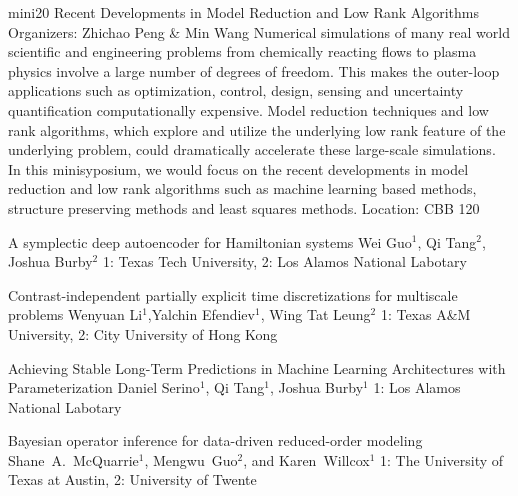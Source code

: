 \mini
{mini20}
{Recent Developments in Model Reduction and Low Rank Algorithms}
{Organizers: Zhichao Peng \& Min Wang}
{Numerical simulations of many real world scientific and engineering problems from chemically reacting flows to plasma physics involve a large number of degrees of freedom. This makes the outer-loop applications such as optimization, control, design, sensing and uncertainty quantification computationally expensive. Model reduction techniques and low rank algorithms, which explore and utilize the underlying low rank feature of the underlying problem, could dramatically accelerate these large-scale simulations. In this minisyposium, we would focus on the recent developments in model reduction and low rank algorithms such as machine learning based methods, structure preserving methods and least squares methods.}
{Location: CBB 120}

\begin{talks}
\item\talk
{A symplectic deep autoencoder for Hamiltonian systems}
{Wei Guo$^{1}$, Qi Tang$^{2}$, Joshua Burby$^{2}$}
{1: Texas Tech University, 2: Los Alamos National Labotary}
\item\talk
{Contrast-independent partially explicit time discretizations for multiscale problems}
{Wenyuan Li$^{1}$,Yalchin Efendiev$^{1}$, Wing Tat Leung$^{2}$}
{1: Texas A\&M University, 2: City University of Hong Kong}
\item\talk
{Achieving Stable Long-Term Predictions in Machine Learning Architectures with Parameterization}
{Daniel Serino$^{1}$, Qi Tang$^{1}$, Joshua Burby$^{1}$}
{1: Los Alamos National Labotary}
\item\talk
{Bayesian operator inference for data-driven reduced-order modeling}
{Shane~A.~McQuarrie$^{1}$, Mengwu~Guo$^{2}$, and Karen~Willcox$^{1}$}
{1: The University of Texas at Austin, 2: University of Twente}
\end{talks}
\room
